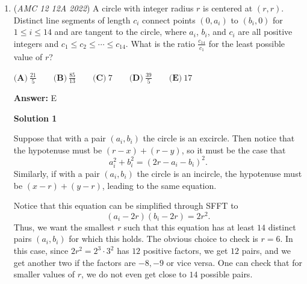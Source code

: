 \begin{enumerate}
\textbf{Solution 10 (Parity Cheese)}

We note that there are 6 different multisets of digits that have an odd number of permutations, namely, 00000, 00001, 00002, 00003, 0004, 01111. We know that there cannot be any other possibilities since, if any digit appears 2 or 3 times, there are $\binom52=\binom53=10$ ways to place those two digits, and thus the total number of permutations must be even. Additionally, if there are at least two digits that appear once, there are $5\cdot 4=20$ ways to place them and the total number of permutations will be even. Hence, we can have only at most $1$ digit that appears once, and the rest must appear either 4 or 5 times ( or 0). From here we may arrive at the above $6$ configurations. Since there is an even number of odd cases, we know that the final answer will be even. After a little bit of casework we observe that 500 is far too low, and thus the answer is $\boxed{1296}.$



	\item (\textit{AMC 12 12A 2022}) A circle with integer radius $r$ is centered at $(r, r)$. Distinct line segments of length $c_i$ connect points $(0, a_i)$ to $(b_i, 0)$ for $1 \le i \le 14$ and are tangent to the circle, where $a_i$, $b_i$, and $c_i$ are all positive integers and $c_1 \le c_2 \le \cdots \le c_{14}$. What is the ratio $\frac{c_{14}}{c_1}$ for the least possible value of $r$?


 $\textbf{(A)} ~\frac{21}{5} \qquad\textbf{(B)} ~\frac{85}{13} \qquad\textbf{(C)} ~7 \qquad\textbf{(D)} ~\frac{39}{5} \qquad\textbf{(E)} ~17$

 \textbf{Answer: }E



\textbf{Solution 1}

Suppose that with a pair $(a_i,b_i)$ the circle is an excircle. Then notice that the hypotenuse must be $(r-x)+(r-y)$, so it must be the case that 
 \[a_i^2+b_i^2=(2r-a_i-b_i)^2.\] Similarly, if with a pair $(a_i,b_i)$ the circle is an incircle, the hypotenuse must be $(x-r)+(y-r)$, leading to the same equation. 

 Notice that this equation can be simplified through SFFT to 
 \[(a_i-2r)(b_i-2r)=2r^2.\] Thus, we want the smallest $r$ such that this equation has at least $14$ distinct pairs $(a_i,b_i)$ for which this holds. The obvious choice to check is $r=6$. In this case, since $2r^2=2^3\cdot 3^2$ has $12$ positive factors, we get $12$ pairs, and we get another two if the factors are $-8,-9$ or vice versa. One can check that for smaller values of $r$, we do not even get close to $14$ possible pairs.


\end{enumerate}
